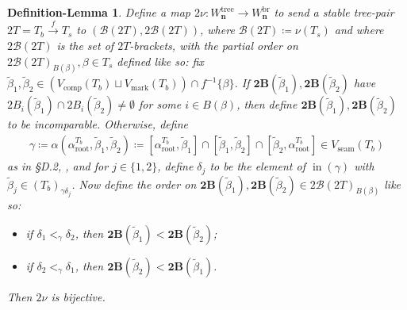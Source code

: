 \documentclass[11pt]{amsart}
\newtheorem{deflem}[theorem]{Definition-Lemma}
\theoremstyle{definition}
\theoremstyle{remark}
\theoremstyle{plain}
\newcommand\bn{\mathbf{n}}
\newcommand{\btB}{{\mathbf{2B}}}
\newcommand{\sB}{\mathscr{B}}
\newcommand{\stB}{2\mathscr{B}}
\newcommand{\on}{\operatorname}
\newcommand{\comp}{C^2}
\renewcommand{\comp}{{\on{comp}}}
\newcommand{\seam}{{\on{seam}}}
\newcommand{\mk}{{\on{mark}}}
\newcommand{\incom}{\on{in}}
\renewcommand{\root}{{\on{root}}}
\newcommand{\tree}{{\on{tree}}}
\newcommand{\br}{{\on{br}}}
\newcommand{\sr}{\stackrel}
\newcommand{\wt}{\widetilde}
\begin{document}
\begin{deflem}
\label{deflem:Wn_models_iso}
\label{p:2nu}
Define a map $2\nu\colon W_\bn^\tree \to W_\bn^\br$ to send a stable tree-pair $2T = T_b \sr{f}{\to} T_s$ to $(\sB(2T),\stB(2T))$, where $\sB(2T) \coloneqq \nu(T_s)$ and where $\stB(2T)$ is the set of $2T$-brackets, with the partial order on $\stB(2T)_{B(\beta)}, \beta \in T_s$ defined like so: fix $\wt\beta_1, \wt\beta_2 \in (V_\comp(T_b) \sqcup V_\mk(T_b)) \cap f^{-1}\{\beta\}$.
If $\btB(\wt\beta_1), \btB(\wt\beta_2)$ have $2B_i(\wt\beta_1) \cap 2B_i(\wt\beta_2) \neq \emptyset$ for some $i \in B(\beta)$, then define $\btB(\wt\beta_1), \btB(\wt\beta_2)$ to be incomparable.
Otherwise, define \label{p:alpha_triple}
\begin{align}
\gamma \coloneqq \alpha(\alpha_\root^{T_b},\wt\beta_1,\wt\beta_2) \coloneqq [\alpha_\root^{T_b},\wt\beta_1] \cap [\wt\beta_1,\wt\beta_2] \cap [\wt\beta_2,\alpha_\root^{T_b}] \in V_\seam(T_b)
\end{align}
as in \S D.2, \cite{ms:jh}, and for $j \in \{1,2\}$, define $\delta_j$ to be the element of $\incom(\gamma)$ with $\wt\beta_j \in (T_b)_{\gamma\delta_j}$.
Now define the order on $\btB(\wt\beta_1), \btB(\wt\beta_2) \in \stB(2T)_{B(\beta)}$ like so:
\begin{itemize}
\item if $\delta_1 <_\gamma \delta_2$, then $\btB(\wt\beta_1) < \btB(\wt\beta_2)$;

\item if $\delta_2 <_\gamma \delta_1$, then $\btB(\wt\beta_2) < \btB(\wt\beta_1)$.
\end{itemize}
Then $2\nu$ is bijective.
\end{deflem}
\end{document}
